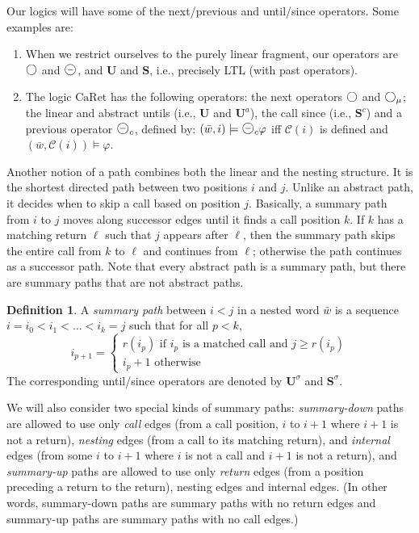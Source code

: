 \documentclass{LMCS}
\newcommand{\M}{{\mu}}
\newcommand{\w}{{\bar{w}}}
\newcommand{\dm}{\Diamond}
\newcommand{\C}{{\mathcal{C}}}
\newcommand{\U}{{\mathbf U}}
\renewcommand{\S}{{\mathbf S}}
\newcommand{\next}{\text{\raisebox{1pt}{$\bigcirc$}}}
\renewcommand{\l}{\ell}
\renewcommand{\phi}{\varphi}
\theoremstyle{plain}
\theoremstyle{definition}
\newtheorem{definition}{Definition}[section]
\newcommand{\ppath}{\sigma} \newcommand{\Ul}{\U}
\newcommand{\Sl}{\S}
\newcommand{\Sc}{\S^c}
\newcommand{\Ur}{\U^a}
\newcommand{\Up}{\U^\ppath}
\newcommand{\Sp}{\S^\ppath}
\newcommand{\prev}{{\text{\Large $\mathbf{\circleddash}$}}}
\newcommand{\caret}{\text{CaRet}}
\newcommand{\dmm}{\dm_{\M}}
\newcommand{\dmminus}{\dm^-}
\renewcommand{\dm}{\next}
\renewcommand{\dmminus}{\prev}
\renewcommand{\dmm}{\dm_\M}
\newcounter{example}
\begin{document}
Our logics will have some of the next/previous and until/since operators. 
Some examples are:
\begin{enumerate}[$\bullet$]
\item When we 
restrict ourselves to the purely linear fragment, our operators are
$\dm$ and $\dmminus$, and $\Ul$ and $\Sl$, i.e., precisely LTL 
(with past operators).
\item
The logic $\caret$ \cite{AEM04} has the following operators:
the next operators $\dm$ and $\dmm$;
the linear and abstract untils (i.e., $\Ul$ and $\Ur$), the call
since (i.e., $\Sc$) and a previous operator $\dmminus_c$,
defined by:  
$(\w, i) \models \dmminus_c \phi$ iff $\C(i)$ is defined and $(\w,
  \C(i)) \models \phi$.
\end{enumerate}

Another notion of a path combines both the linear and the nesting
structure. It is the shortest directed path between two positions 
$i$ and $j$. Unlike
an abstract path, it decides when to skip a 
call based on position $j$. Basically, a summary path from $i$ to $j$ moves along successor
edges until it finds a call position $k$. 
If $k$ has a matching return $\l$ such that $j$ appears after $\l$,
then the summary path skips the entire call from $k$ to $\l$ and
continues from $\l$; otherwise 
the path continues as a successor path.
Note that every abstract path is a summary path, but there are summary paths that are
not abstract paths.

\begin{definition}
A {\em summary path} between $i < j$ in a nested word $\w$ is a sequence
$i=i_0 < i_1 < \ldots < i_k=j$ such that for all $p < k$, 
$$i_{p+1} = 
\begin{cases}
r(i_p) \text{ if } i_p\text{ is a 
matched call and }j \geq r(i_p) \\
i_p+1 \text{ otherwise}\end{cases}$$
The corresponding until/since operators are denoted by $\Up$ and
$\Sp$. 
\end{definition}

We will also consider two special kinds of summary paths: {\em
summary-down\/} paths are allowed to use only {\em call} edges (from a
call position, $i$ to $i+1$ where $i+1$ is not a return), {\em nesting} edges (from
a call to its matching return), and {\em internal} edges (from some
$i$ to $i+1$ where $i$ is not a call and $i+1$ is not a return), and {\em
summary-up\/} paths are allowed to use only {\em return} edges (from a
position preceding a return to the return), nesting edges and internal
edges.  (In other words, summary-down paths are summary paths with no
return edges and summary-up paths are summary paths with no call edges.)
\end{document}
